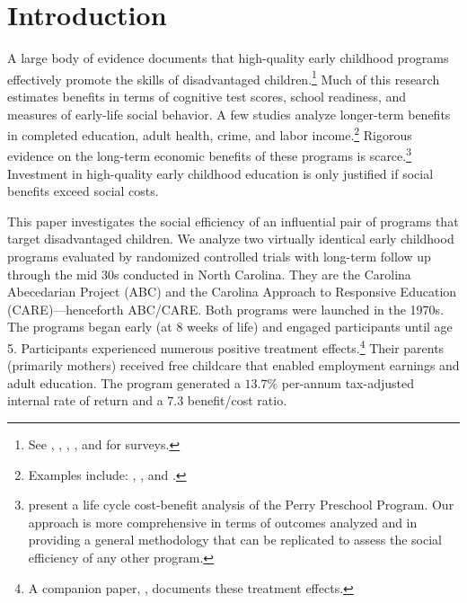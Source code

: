 \section{Introduction}

\noindent A large body of evidence documents that high-quality early childhood programs effectively promote the skills of disadvantaged children.\footnote{See \citet{Blau_Currie_2006_HEE}, \citet{Cunha_Heckman_ea_2006_HEE}, \citet{Duncan_Magnuson_2013_JEP}, \citet{Almond-Currie_2011_JEP}, and \citet{Elango_Hojman_etal_2016_Early-Edu} for surveys.} Much of this research estimates benefits in terms of cognitive test scores, school readiness, and measures of early-life social behavior. A few studies analyze longer-term benefits in completed education, adult health, crime, and labor income.\footnote{Examples include: \citet{Heckman_Moon_etal_2010_QE}, \citet{Havnes_Mogstad_2011_AEJEP}, and \citet{Campbell_Conti_etal_2014_EarlyChildhoodInvestments}.} Rigorous evidence on the long-term economic benefits of these programs is scarce.\footnote{\citet{Heckman_Moon_etal_2010_RateofReturn} present a life cycle cost-benefit analysis of the Perry Preschool Program. Our approach is more comprehensive in terms of outcomes analyzed and in providing a general methodology that can be replicated to assess the social efficiency of any other program.} Investment in high-quality early childhood education is only justified if social benefits exceed social costs.

This paper investigates the social efficiency of an influential pair of programs that target disadvantaged children. We analyze two virtually identical early childhood programs evaluated by randomized controlled trials with long-term follow up through the mid 30s conducted in North Carolina. They are the Carolina Abecedarian Project (ABC) and the Carolina Approach to Responsive Education (CARE)---henceforth ABC/CARE. Both programs were launched in the 1970s. The programs began early (at 8 weeks of life) and engaged participants until age 5. Participants experienced numerous positive treatment effects.\footnote{A companion paper, \citet{Garcia_Heckman_Ziff_2017_Gender-Diff_UNPUBLISHED}, documents these treatment effects.} Their parents (primarily mothers) received free childcare that enabled employment earnings and adult education. The program generated a $13.7\%$ per-annum tax-adjusted internal rate of return and a $7.3$ benefit/cost ratio.

